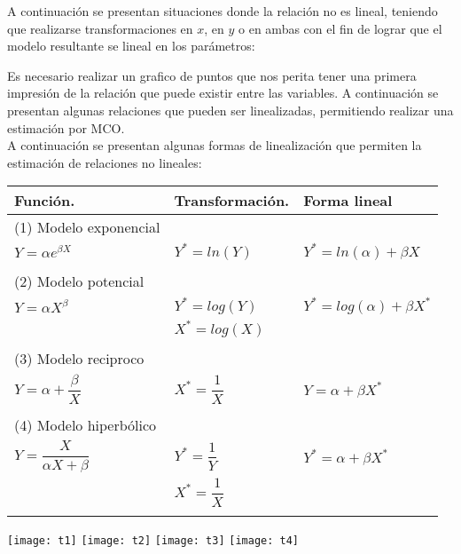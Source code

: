 \documentclass[base=hide,12pt]{elegantbook}
\begin{document}
   A continuación se presentan situaciones donde la relación no es lineal, teniendo que realizarse transformaciones en $x$, en $y$ o en ambas con el fin de lograr que el modelo resultante se lineal en los parámetros:
   
   Es necesario realizar un grafico de puntos que nos perita tener una primera impresión de la relación que puede existir entre las variables.  A continuación se presentan algunas relaciones que pueden ser linealizadas, permitiendo realizar una estimación por MCO. \\
   
   
  A continuación se presentan algunas formas de linealización que permiten la estimación de relaciones no lineales: 
\begin{center}
	 \begin{tabular}{lll}
\hline  	
 Función\hspace{3cm}. & Transformación\hspace{2cm}.& Forma lineal \\
\hline  
(1) Modelo exponencial &&\\
$Y = \alpha e^{\beta X}$ & $Y^{*}=ln(Y)$                            & $Y^{*} =ln(\alpha) + \beta X$\\  

&&\\
\hline 
(2) Modelo potencial &&\\
$Y = \alpha X^{\beta}$ & $Y^{*}=log(Y)$  & $Y^{*} =log(\alpha) + \beta X^{*}$\\ 
& $X^{*}=log(X)$  &                                    \\ 
&&\\
\hline
(3) Modelo reciproco &&\\
$Y = \alpha + \dfrac{\beta}{X} $ & $X^{*}=\dfrac{1}{X}$                        & $Y =\alpha + \beta X^{*}$\\ 
&&\\
\hline 
(4) Modelo hiperbólico &&\\
$Y=\dfrac{X}{\alpha X + \beta }$ &  	$Y^{*}=\dfrac{1}{Y}$ & $Y^{*} =\alpha + \beta X^{*}$\\
                                & $X^{*}=\dfrac{1}{X}$   &  \\
&&\\                                
\hline  
 \end{tabular}
\end{center}
   
 \begin{center}
 	 \texttt{[image: t1]}  
 	 \texttt{[image: t2]}  
 	 \texttt{[image: t3]}  
 	 \texttt{[image: t4]}  
 \end{center}
   
\end{document}
